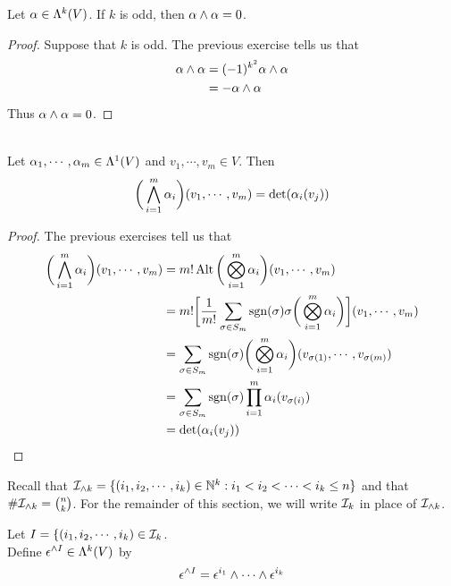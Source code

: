 \documentclass{book}
\begin{document}
	\begin{ex}
		Let $\alpha \in \Lambda^k(V)$. If $k$ is odd, then $\alpha \wedge \alpha = 0$. 
	\end{ex}

	\begin{proof}
		Suppose that $k$ is odd. The previous exercise tells us that 
		\begin{align*}
			\alpha \wedge \alpha 
			&= (-1)^{k^2} \alpha \wedge \alpha \\
			&= -\alpha \wedge \alpha
		\end{align*}
		Thus $\alpha \wedge \alpha = 0$.
	\end{proof}
	
	\begin{ex}\\
		Let $\alpha_1, \cdots, \alpha_m \in \Lambda^1(V)$ and $v_1, \cdots, v_m \in V$. Then $$\bigg( \bigwedge_{i=1}^m \alpha_i \bigg)(v_1, \cdots, v_m) = \det (\alpha_i (v_j))$$
	\end{ex}

	\begin{proof}
		The previous exercises tell us that
		\begin{align*}
			\bigg( \bigwedge_{i=1}^m \alpha_i \bigg)(v_1, \cdots, v_m)
			&= m! \operatorname{Alt} \bigg( \bigotimes_{i=1}^m \alpha_i \bigg) (v_1, \cdots, v_m) \\
			&= m! \bigg[ \frac{1}{m!} \sum_{\sigma \in S_{m}} \operatorname{sgn}(\sigma) \sigma \bigg(\bigotimes_{i=1}^m \alpha_i \bigg) \bigg] (v_1, \cdots, v_m) \\
			&= \sum_{\sigma \in S_{m}} \operatorname{sgn}(\sigma)  \bigg(\bigotimes_{i=1}^m \alpha_i \bigg) (v_{\sigma(1)}, \cdots, v_{\sigma(m)}) \\
			&= \sum_{\sigma \in S_{m}} \operatorname{sgn}(\sigma)  \prod_{i=1}^m \alpha_i(v_{\sigma(i)})   \\
			&= \det (\alpha_i (v_j))
		\end{align*}
	\end{proof}

	\begin{note}
		Recall that $\mathcal{I}_{\wedge k} = \{(i_1, i_2, \cdots, i_k) \in \mathbb{N}^k: i_1 < i_2 < \cdots < i_k \leq n \}$ and that $\# \mathcal{I}_{\wedge k} = {n \choose k}$. For the remainder of this section, we will write $\mathcal{I}_k$ in place of $\mathcal{I}_{\wedge k}$.
	\end{note}

	\begin{defn}
		Let $I = \{(i_1, i_2, \cdots, i_k) \in \mathcal{I}_k$. \\ Define $\epsilon^{\wedge I} \in \Lambda^k(V)$ by $$ \epsilon^{\wedge I} = \epsilon^{i_1} \wedge \cdots \wedge \epsilon^{i_k} $$ 
	\end{defn}
\end{document}
